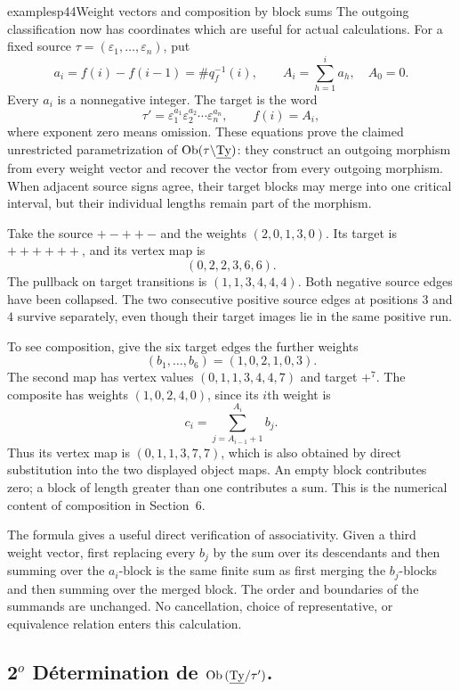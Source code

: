 \begin{dcomment}{examples}{p44}{Weight vectors and composition by block sums}
The outgoing classification now has coordinates which are useful for actual calculations. For a fixed source $\tau=(\varepsilon_1,\ldots,\varepsilon_n)$, put
\[
 a_i=f(i)-f(i-1)=\#q_f^{-1}(i),\qquad
 A_i=\sum_{h=1}^{i}a_h,\quad A_0=0.
\]
Every $a_i$ is a nonnegative integer. The target is the word
\[
 \tau'=\varepsilon_1^{a_1}\varepsilon_2^{a_2}\cdots\varepsilon_n^{a_n},
 \qquad f(i)=A_i,
\]
where exponent zero means omission. These equations prove the claimed unrestricted parametrization of $\operatorname{Ob}(\tau\backslash\underline{\mathrm{Ty}})$: they construct an outgoing morphism from every weight vector and recover the vector from every outgoing morphism. When adjacent source signs agree, their target blocks may merge into one critical interval, but their individual lengths remain part of the morphism.

Take the source $+-++-$ and the weights $(2,0,1,3,0)$. Its target is $++++++$, and its vertex map is
\[
 (0,2,2,3,6,6).
\]
The pullback on target transitions is $(1,1,3,4,4,4)$. Both negative source edges have been collapsed. The two consecutive positive source edges at positions $3$ and $4$ survive separately, even though their target images lie in the same positive run.

To see composition, give the six target edges the further weights
\[
 (b_1,\ldots,b_6)=(1,0,2,1,0,3).
\]
The second map has vertex values $(0,1,1,3,4,4,7)$ and target $+^7$. The composite has weights $(1,0,2,4,0)$, since its $i$th weight is
\[
 c_i=\sum_{j=A_{i-1}+1}^{A_i}b_j.
\]
Thus its vertex map is $(0,1,1,3,7,7)$, which is also obtained by direct substitution into the two displayed object maps. An empty block contributes zero; a block of length greater than one contributes a sum. This is the numerical content of composition in Section~6.

The formula gives a useful direct verification of associativity. Given a third weight vector, first replacing every $b_j$ by the sum over its descendants and then summing over the $a_i$-block is the same finite sum as first merging the $b_j$-blocks and then summing over the merged block. The order and boundaries of the summands are unchanged. No cancellation, choice of representative, or equivalence relation enters this calculation.
\end{dcomment}


\subsection*{2$^o$ Détermination de $\mathrm{Ob}\,(\underline{\mathrm{Ty}}/\tau')$.}

